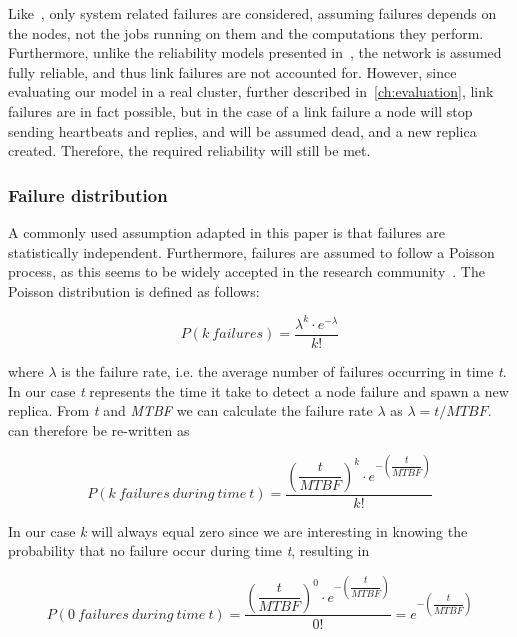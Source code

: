 \documentclass{cslthse-msc}
\begin{document}
Like~\cite{selfAdaptRel}, only system related failures are considered, assuming failures depends on the nodes, not the jobs running on them and the computations they perform. Furthermore, unlike the reliability models presented in~\cite{taskSchedulingReplication, taskAllocationSwarm, relAnalysisFRA}, the network is assumed fully reliable, and thus link failures are not accounted for. However, since evaluating our model in a real cluster, further described in~\cref{ch:evaluation}, link failures are in fact possible, but in the case of a link failure a node will stop sending heartbeats and replies, and will be assumed dead, and a new replica created. Therefore, the required reliability will still be met. 

\subsubsection{Failure distribution}
A commonly used assumption adapted in this paper is that failures are statistically independent. Furthermore, failures are assumed to follow a Poisson process, as this seems to be widely accepted in the research community~\cite{experimentalFailureAssessment}. The Poisson distribution is defined as follows:

\begin{equation} \label{eq:Poisson}
P(k\ failures) = \dfrac{\lambda^k \cdot e^{-\lambda}}{k!}
\end{equation}

where $\lambda$ is the failure rate, i.e. the average number of failures occurring in time \emph{t}. In our case \emph{t} represents the time it take to detect a node failure and spawn a new replica. From \emph{t} and \emph{MTBF} we can calculate the failure rate $\lambda$ as $\lambda = t/MTBF$.  can therefore be re-written as

\begin{equation} \label{eq:Poisson_during_time_t}
P(k\ failures\ during\ time\ t) = \dfrac{\left(\dfrac{t}{MTBF}\right)^k \cdot e^{-\left(\dfrac{t}{MTBF}\right)}}{k!}
\end{equation}

In our case \emph{k} will always equal zero since we are interesting in knowing the probability that no failure occur during time \emph{t}, resulting in

\begin{equation} \label{eq:Poisson_no_failures}
P(0\ failures\ during\ time\ t) = \dfrac{\left(\dfrac{t}{MTBF}\right)^0 \cdot e^{-\left(\dfrac{t}{MTBF}\right)}}{0!} = e^{-\left(\dfrac{t}{MTBF}\right)}
\end{equation}
\end{document}
